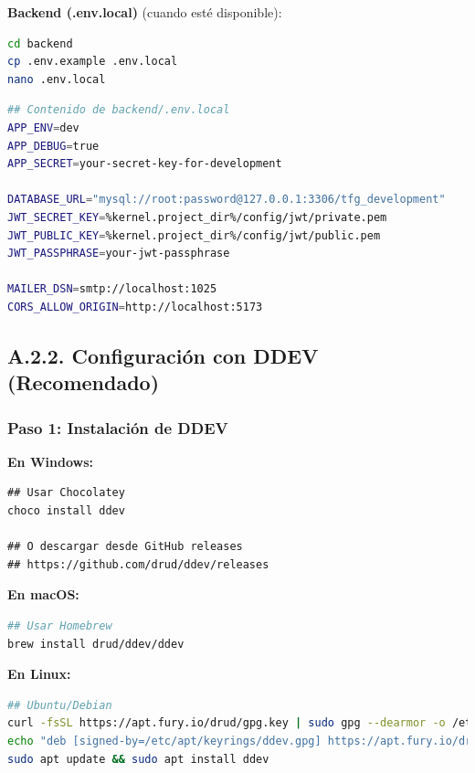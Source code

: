 \documentclass[12pt,a4paper,oneside]{report}
\begin{document}
\textbf{Backend (.env.local)} (cuando esté disponible):

\begin{lstlisting}[language=bash]
cd backend
cp .env.example .env.local
nano .env.local
\end{lstlisting}

\begin{lstlisting}[language=bash]
## Contenido de backend/.env.local
APP_ENV=dev
APP_DEBUG=true
APP_SECRET=your-secret-key-for-development

DATABASE_URL="mysql://root:password@127.0.0.1:3306/tfg_development"
JWT_SECRET_KEY=%kernel.project_dir%/config/jwt/private.pem
JWT_PUBLIC_KEY=%kernel.project_dir%/config/jwt/public.pem
JWT_PASSPHRASE=your-jwt-passphrase

MAILER_DSN=smtp://localhost:1025
CORS_ALLOW_ORIGIN=http://localhost:5173
\end{lstlisting}

\subsection{A.2.2. Configuración con DDEV
(Recomendado)}\label{a.2.2.-configuraciuxf3n-con-ddev-recomendado}

\subsubsection{Paso 1: Instalación de
DDEV}\label{paso-1-instalaciuxf3n-de-ddev}

\textbf{En Windows:}

\begin{lstlisting}
## Usar Chocolatey
choco install ddev

## O descargar desde GitHub releases
## https://github.com/drud/ddev/releases
\end{lstlisting}

\textbf{En macOS:}

\begin{lstlisting}[language=bash]
## Usar Homebrew
brew install drud/ddev/ddev
\end{lstlisting}

\textbf{En Linux:}

\begin{lstlisting}[language=bash]
## Ubuntu/Debian
curl -fsSL https://apt.fury.io/drud/gpg.key | sudo gpg --dearmor -o /etc/apt/keyrings/ddev.gpg
echo "deb [signed-by=/etc/apt/keyrings/ddev.gpg] https://apt.fury.io/drud/ * *" | sudo tee /etc/apt/sources.list.d/ddev.list
sudo apt update && sudo apt install ddev
\end{lstlisting}
\end{document}
